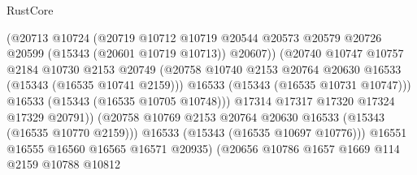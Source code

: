 \begin{lexlean}{RustCore}
\begin{coremodule}
                                    (@20713
                                      @10724
                                      (@20719
                                        @10712
                                        @10719
                                        @20544
                                        @20573
                                        @20579
                                        @20726
                                        @20599
                                        (@15343 (@20601 @10719 @10713))
                                        @20607))
                                    (@20740
                                      @10747
                                      @10757
                                      @2184
                                      @10730
                                      @2153
                                      @20749
                                      (@20758
                                        @10740
                                        @2153
                                        @20764
                                        @20630
                                        @16533
                                        (@15343 (@16535 @10741 @2159)))
                                      @16533
                                      (@15343 (@16535 @10731 @10747)))
                                    @16533
                                    (@15343 (@16535 @10705 @10748)))
                                  @17314
                                  @17317
                                  @17320
                                  @17324
                                  @17329
                                  @20791))
                              (@20758
                                @10769
                                @2153
                                @20764
                                @20630
                                @16533
                                (@15343 (@16535 @10770 @2159)))
                              @16533
                              (@15343 (@16535 @10697 @10776)))
                            @16551
                            @16555
                            @16560
                            @16565
                            @16571
                            @20935)
                          (@20656
                            @10786
                            @1657
                            @1669
                            @114
                            @2159
                            @10788
                            @10812

\end{coremodule}
\end{lexlean}
